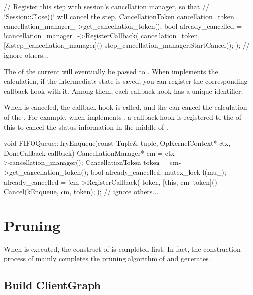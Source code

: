 \begin{content}
\begin{leftbar}
\begin{c++}
{  // Register this step with session's cancellation manager, so that
  // `Session::Close()` will cancel the step.
  CancellationToken cancellation_token =
      cancellation_manager_->get_cancellation_token();
  bool already_cancelled = !cancellation_manager_->RegisterCallback(
      cancellation_token, [&step_cancellation_manager]() {
        step_cancellation_manager.StartCancel();
      });
  // ignore others...
}
\end{c++}
\end{leftbar}

The  of the current  will eventually be passed to . When  implements the calculation, if the intermediate state is saved, you can register the corresponding callback hook with it. Among them, each callback hook has a unique  identifier.

When  is canceled, the callback hook is called, and the  can cancel the calculation of the . For example, when  implements , a callback hook is registered to the  of this  to cancel the status information in the middle of .

\begin{leftbar}
\begin{c++}
void FIFOQueue::TryEnqueue(const Tuple& tuple, OpKernelContext* ctx,
                           DoneCallback callback) {
  CancellationManager* cm = ctx->cancellation_manager();
  CancellationToken token = cm->get_cancellation_token();
  bool already_cancelled;
  {
    mutex_lock l(mu_);
    already_cancelled = !cm->RegisterCallback(
        token, [this, cm, token]() { Cancel(kEnqueue, cm, token); });
  }
  // ignore others...
}
\end{c++}
\end{leftbar}


\section{Pruning}
\label{sec:graph-operation-prune}

When  is executed, the construct of  is completed first. In fact, the construction process of  mainly completes the pruning algorithm of  and generates .

\subsection{Build ClientGraph}


\end{content}
